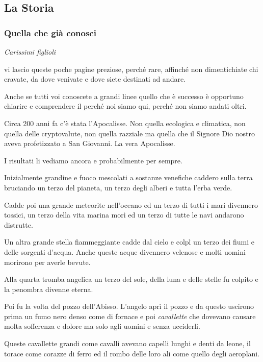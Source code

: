 \documentclass[12pt,a4paper,twoside,openany]{book}
\begin{document}
\subsection{La Storia}

\begin{multicols}{2}
	
\subsubsection{Quella che già conosci}

\textit{Carissimi figlioli}

vi lascio queste poche pagine preziose, perché rare, affinché non dimentichiate chi eravate, da dove venivate e dove siete destinati ad andare.

Anche se tutti voi conoscete a grandi linee quello che è successo è opportuno chiarire e comprendere il perché noi siamo qui, perché non siamo andati oltri.

Circa 200 anni fa c'è stata l'Apocalisse. Non quella ecologica e climatica, non quella delle cryptovalute, non quella razziale ma quella che il Signore Dio nostro aveva profetizzato a San Giovanni. La vera Apocalisse.

I risultati li vediamo ancora e probabilmente per sempre.

Inizialmente grandine e fuoco mescolati a sostanze venefiche caddero sulla terra bruciando un terzo del pianeta, un terzo degli alberi e tutta l'erba verde.

Cadde poi una grande meteorite nell'oceano ed un terzo di tutti i mari divennero tossici, un terzo della vita marina morì ed un terzo di tutte le navi andarono distrutte.

Un altra grande stella fiammeggiante cadde dal cielo e colpì un terzo dei fiumi e delle sorgenti d'acqua. Anche queste acque divennero velenose e molti uomini morirono per averle bevute.

Alla quarta tromba angelica un terzo del sole, della luna e delle stelle fu colpito e la penombra divenne eterna.

Poi fu la volta del pozzo dell'Abisso. L'angelo aprì il pozzo e da questo uscirono prima un fumo nero denso come di fornace e poi \textit{cavallette} che dovevano causare molta sofferenza e dolore ma solo agli uomini e senza ucciderli.

Queste cavallette grandi come cavalli avevano capelli lunghi e denti da leone, il torace come corazze di ferro ed il rombo delle loro ali come quello degli aeroplani.


\end{multicols}
\end{document}

